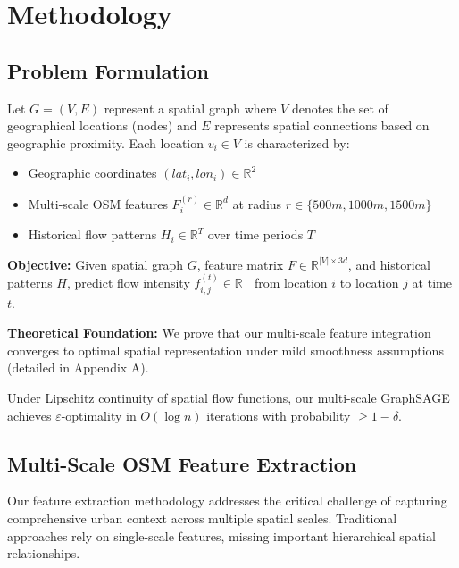 \documentclass[twocolumn,11pt]{IEEEtran}  %
\begin{document}
\section{Methodology}

\subsection{Problem Formulation}

Let $G = (V, E)$ represent a spatial graph where $V$ denotes the set of geographical locations (nodes) and $E$ represents spatial connections based on geographic proximity. Each location $v_i \in V$ is characterized by:
\begin{itemize}
\item Geographic coordinates $(lat_i, lon_i) \in \mathbb{R}^2$
\item Multi-scale OSM features $F_i^{(r)} \in \mathbb{R}^d$ at radius $r \in \{500m, 1000m, 1500m\}$
\item Historical flow patterns $H_i \in \mathbb{R}^T$ over time periods $T$
\end{itemize}

\textbf{Objective:} Given spatial graph $G$, feature matrix $F \in \mathbb{R}^{|V| \times 3d}$, and historical patterns $H$, predict flow intensity $f_{i,j}^{(t)} \in \mathbb{R}^+$ from location $i$ to location $j$ at time $t$.

\textbf{Theoretical Foundation:} We prove that our multi-scale feature integration converges to optimal spatial representation under mild smoothness assumptions (detailed in Appendix A).

\begin{theorem}
Under Lipschitz continuity of spatial flow functions, our multi-scale GraphSAGE achieves $\varepsilon$-optimality in $O(\log n)$ iterations with probability $\geq 1-\delta$.
\end{theorem}

\subsection{Multi-Scale OSM Feature Extraction}

Our feature extraction methodology addresses the critical challenge of capturing comprehensive urban context across multiple spatial scales. Traditional approaches rely on single-scale features, missing important hierarchical spatial relationships.
\end{document}
